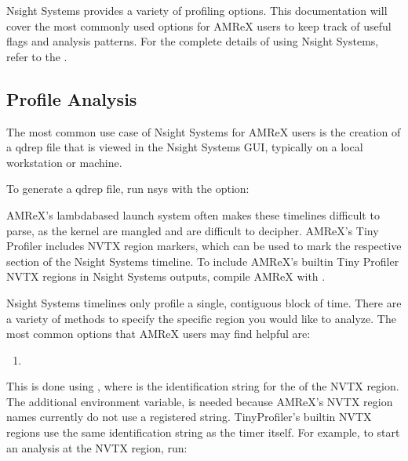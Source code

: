 \documentclass[letterpaper,10pt,english]{sphinxmanual}
\begin{document}
\sphinxAtStartPar
Nsight Systems provides a variety of profiling options.  This documentation will cover the
most commonly used options for AMReX users to keep track of useful flags and analysis
patterns. For the complete details of using Nsight Systems, refer to the .


\subsection{Profile Analysis}
\label{\detokenize{External_Profiling_Tools:profile-analysis}}
\sphinxAtStartPar
The most common use case of Nsight Systems for AMReX users is the creation of a qdrep file
that is viewed in the Nsight Systems GUI, typically on a local workstation or machine.

\sphinxAtStartPar
To generate a qdrep file, run nsys with the  option:

\begin{sphinxVerbatim}[commandchars=\\\{\}]
\end{sphinxVerbatim}

\sphinxAtStartPar
AMReX’s lambda\sphinxhyphen{}based launch system often makes these timelines difficult to parse, as the kernel
are mangled and are difficult to decipher. AMReX’s Tiny Profiler includes NVTX region markers,
which can be used to mark the respective section of the Nsight Systems timeline.  To include AMReX’s
built\sphinxhyphen{}in Tiny Profiler NVTX regions in Nsight Systems outputs, compile AMReX with .

\sphinxAtStartPar
Nsight Systems timelines only profile a single, contiguous block of time. There are a variety of
methods to specify the specific region you would like to analyze. The most common options that AMReX users
may find helpful are:
\begin{enumerate}
%
\item {} 
\sphinxAtStartPar
{}

\end{enumerate}

\sphinxAtStartPar
This is done using , where 
is the identification string for the of the NVTX region. The additional environment variable,
 is needed because AMReX’s NVTX region names currently do not use a registered string.
TinyProfiler’s built\sphinxhyphen{}in NVTX regions use the same identification string as the timer itself. For
example, to start an analysis at the  NVTX region, run:
\end{document}
